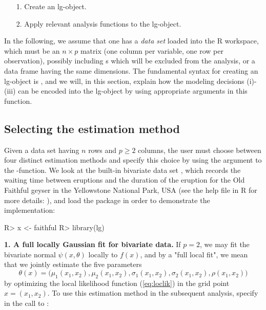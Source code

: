 \begin{itemize}
\item[1.] Create an lg-object.
\item[2.] Apply relevant analysis functions to the lg-object.
\end{itemize}

In the following, we assume that one has a \emph{data set}  loaded into the R workspace, which must be an $n\times p$ matrix (one column per variable, one row per observation), possibly including s which will be excluded from the analysis, or a data frame having the same dimensions. The fundamental syntax for creating an lg-object is , and we will, in this section, explain how the modeling decisions (i)-(iii) can be encoded into the lg-object by using appropriate arguments in this function.

\subsection{Selecting the estimation method}
\label{chap:est-method}

Given a data set  having $n$ rows and $p \geq 2$ columns, the user must choose between four distinct estimation methods and specify this choice by using the argument  to the -function. We look at the built-in bivariate data set , which records the waiting time between eruptions and the duration of the eruption for the Old Faithful geyser in the Yellowstone National Park, USA (see the help file in R for more details: ), and load the  package in order to demonstrate the implementation:

\begin{example}
R> x <- faithful
R> library(lg)
\end{example}

\textbf{1. A full locally Gaussian fit for bivariate data.} If $p = 2$, we may fit the bivariate normal $\psi\left(x, \theta\right)$ locally to $f\left(x\right)$, and by a "full local fit", we mean that we jointly estimate the five parameters
$$\theta\left(x\right) = \big(\mu_1\left(x_1, x_2\right), \mu_2\left(x_1, x_2\right), \sigma_1\left(x_1, x_2\right), \sigma_2\left(x_1,x_2\right),\rho\left(x_1, x_2\right)\big)$$
by optimizing the local likelihood function (\ref{eq:loclik}) in the grid point $x = \left(x_1, x_2\right)$. To use this estimation method in the subsequent analysis, specify  in the call to :

